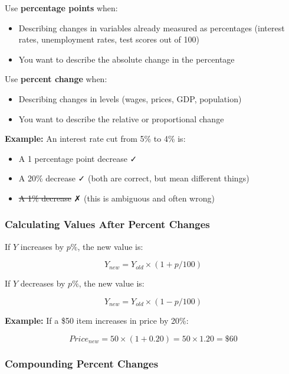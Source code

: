 \documentclass[
  letterpaper,
  DIV=11,
  numbers=noendperiod]{scrreprt}
\providecommand{\tightlist}{%
  \setlength{\itemsep}{0pt}\setlength{\parskip}{0pt}}
\begin{document}
Use \textbf{percentage points} when:

\begin{itemize}
\tightlist
\item
  Describing changes in variables already measured as percentages
  (interest rates, unemployment rates, test scores out of 100)
\item
  You want to describe the absolute change in the percentage
\end{itemize}

Use \textbf{percent change} when:

\begin{itemize}
\tightlist
\item
  Describing changes in levels (wages, prices, GDP, population)
\item
  You want to describe the relative or proportional change
\end{itemize}

\textbf{Example:} An interest rate cut from 5\% to 4\% is:

\begin{itemize}
\tightlist
\item
  A 1 percentage point decrease ✓
\item
  A 20\% decrease ✓ (both are correct, but mean different things)
\item
  \st{A 1\% decrease} ✗ (this is ambiguous and often wrong)
\end{itemize}

\subsubsection{Calculating Values After Percent
Changes}\label{calculating-values-after-percent-changes}

If \(Y\) increases by \(p\%\), the new value is:

\[Y_{new} = Y_{old} \times (1 + p/100)\]

If \(Y\) decreases by \(p\%\), the new value is:

\[Y_{new} = Y_{old} \times (1 - p/100)\]

\textbf{Example:} If a \$50 item increases in price by 20\%:

\[Price_{new} = 50 \times (1 + 0.20) = 50 \times 1.20 = \$60\]

\subsubsection{Compounding Percent
Changes}\label{compounding-percent-changes}
\end{document}
